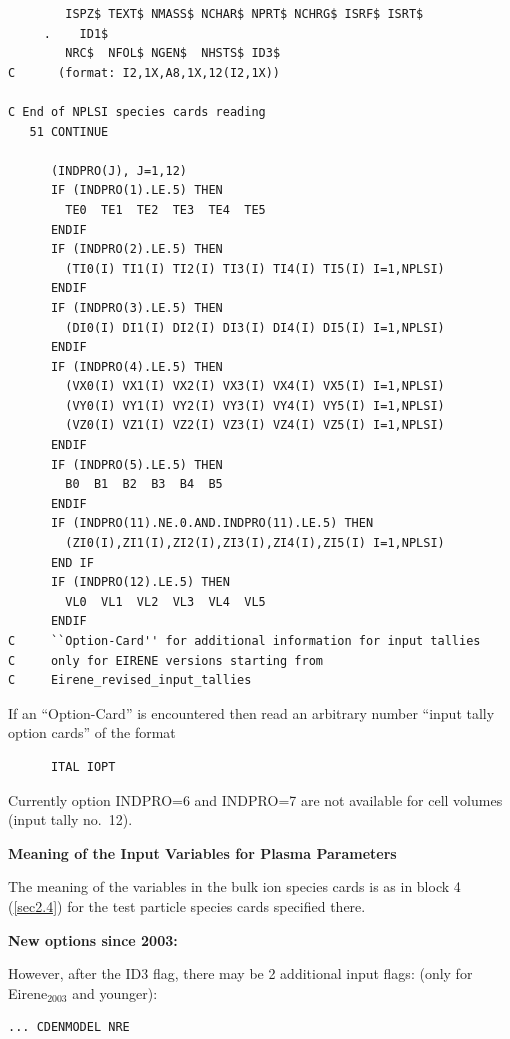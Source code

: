 \begin{lstlisting}
        ISPZ$ TEXT$ NMASS$ NCHAR$ NPRT$ NCHRG$ ISRF$ ISRT$
     .    ID1$
        NRC$  NFOL$ NGEN$  NHSTS$ ID3$
C      (format: I2,1X,A8,1X,12(I2,1X))

C End of NPLSI species cards reading
   51 CONTINUE

      (INDPRO(J), J=1,12)
      IF (INDPRO(1).LE.5) THEN
        TE0  TE1  TE2  TE3  TE4  TE5
      ENDIF
      IF (INDPRO(2).LE.5) THEN
        (TI0(I) TI1(I) TI2(I) TI3(I) TI4(I) TI5(I) I=1,NPLSI)
      ENDIF
      IF (INDPRO(3).LE.5) THEN
        (DI0(I) DI1(I) DI2(I) DI3(I) DI4(I) DI5(I) I=1,NPLSI)
      ENDIF
      IF (INDPRO(4).LE.5) THEN
        (VX0(I) VX1(I) VX2(I) VX3(I) VX4(I) VX5(I) I=1,NPLSI)
        (VY0(I) VY1(I) VY2(I) VY3(I) VY4(I) VY5(I) I=1,NPLSI)
        (VZ0(I) VZ1(I) VZ2(I) VZ3(I) VZ4(I) VZ5(I) I=1,NPLSI)
      ENDIF
      IF (INDPRO(5).LE.5) THEN
        B0  B1  B2  B3  B4  B5
      ENDIF
      IF (INDPRO(11).NE.0.AND.INDPRO(11).LE.5) THEN
        (ZI0(I),ZI1(I),ZI2(I),ZI3(I),ZI4(I),ZI5(I) I=1,NPLSI)
      END IF
      IF (INDPRO(12).LE.5) THEN
        VL0  VL1  VL2  VL3  VL4  VL5
      ENDIF
C     ``Option-Card'' for additional information for input tallies
C     only for EIRENE versions starting from
C     Eirene_revised_input_tallies
\end{lstlisting}

If an ``Option-Card'' is encountered then
read an arbitrary number ``input tally option cards'' of the format

\begin{lstlisting}
      ITAL IOPT
\end{lstlisting}

Currently option INDPRO=6 and INDPRO=7 are not available for cell volumes
(input tally no.\ 12).

\medskip

\textbf{Meaning of the Input Variables for Plasma Parameters}

\medskip

The meaning of the variables in the bulk ion species cards is as in block 4
(\cref{sec2.4}) for the test particle species cards specified there.

\textbf{New options since 2003:}

However, after the ID3 flag, there may be 2 additional input flags: (only for
Eirene$_{2003}$ and younger):

\begin{lstlisting}
... CDENMODEL NRE
\end{lstlisting}

